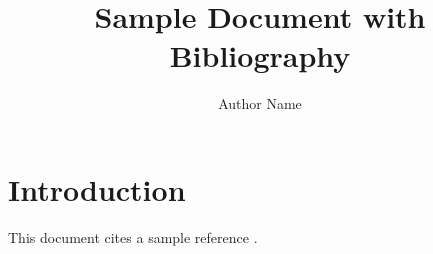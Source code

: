 \documentclass{article}
\title{Sample Document with Bibliography}
\author{Author Name}
\date{}
\begin{document}
\maketitle

\section{Introduction}
This document cites a sample reference \cite{lamport94}.



\end{document}
